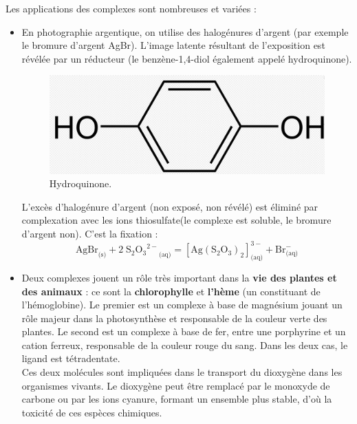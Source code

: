 \documentclass[11pt,a4paper]{report}
\begin{document}
Les applications des complexes sont nombreuses et variées :
\begin{itemize}
	\item En photographie argentique, on utilise des halogénures d'argent (par exemple le bromure 		d'argent AgBr). L'image latente résultant de l'exposition est révélée par un réducteur (le 			benzène-1,4-diol également appelé hydroquinone).
	
	\begin{figure}[h!]
		\begin{center}
  		\includegraphics[scale = 0.5]{hydroquinone.png} 
		\caption{Hydroquinone.}
		\end{center}
	\end{figure}
	
	L'excès d'halogénure d'argent (non exposé, non révélé) est éliminé par complexation avec les 			ions thiosulfate(le complexe est soluble, le bromure d'argent non). C'est la fixation :
	\begin{equation}
		\text{AgBr}_\text{(s)} + 2\;{{\text{S}_2\text{O}_3}^{2-}}_\text{(aq)}
		= [\text{Ag}(\text{S}_2\text{O}_3)_2]^{3-}_\text{(aq)} + \text{Br}^{-}_\text{(aq)} 
	\end{equation}

	\item Deux complexes jouent un rôle très important dans la \textbf{vie des plantes et des 			animaux} : ce sont la \textbf{chlorophylle} et \textbf{l'hème} (un constituant de 					l'hémoglobine). Le premier est un complexe à base de magnésium jouant un rôle majeur dans la 		photosynthèse et responsable de la couleur verte des plantes. Le second est un complexe à base 		de fer, entre une porphyrine et un cation ferreux, responsable de la couleur rouge du sang. 		Dans les deux cas, le ligand est	tétradentate.\\

	Ces deux molécules sont impliquées dans le transport du dioxygène dans les organismes vivants. 		Le dioxygène peut être remplacé par le monoxyde de carbone ou par les ions cyanure, formant un 		ensemble plus stable, d'où la toxicité de ces espèces chimiques.


\end{itemize}
\end{document}
